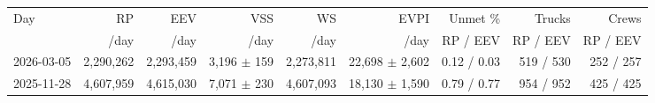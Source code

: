 \begin{tabular}{@{}lrrrrrrrr@{}}\toprule
Day & RP & EEV & VSS & WS & EVPI & Unmet \% & Trucks & Crews \\
 & \EUR{}/day & \EUR{}/day & \EUR{}/day & \EUR{}/day & \EUR{}/day & RP / EEV & RP / EEV & RP / EEV \\ \midrule
2026-03-05 & 2{,}290{,}262 & 2{,}293{,}459 & 3{,}196 $\pm$ 159 & 2{,}273{,}811 & 22{,}698 $\pm$ 2{,}602 & 0.12 / 0.03 & 519 / 530 & 252 / 257 \\
2025-11-28 & 4{,}607{,}959 & 4{,}615{,}030 & 7{,}071 $\pm$ 230 & 4{,}607{,}093 & 18{,}130 $\pm$ 1{,}590 & 0.79 / 0.77 & 954 / 952 & 425 / 425 \\
\bottomrule\end{tabular}
